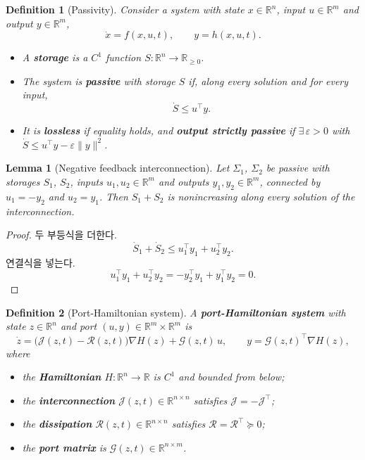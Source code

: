 \documentclass[11pt]{article}\usepackage[margin=1in]{geometry}\usepackage{amsmath,amssymb,amsthm,mathtools}\usepackage{graphicx}\graphicspath{{figures/}{../figures/}{figs/}{./}}\usepackage{enumitem}\usepackage{hyperref}\usepackage{cleveref}\usepackage{tikz}\usetikzlibrary{arrows.meta,positioning,calc,shapes.geometric}\usepackage{float}\usepackage{rotating}\usepackage[most]{tcolorbox}\usepackage{kotex}\usepackage{booktabs}\usepackage{longtable}\emergencystretch=1.6em\tolerance=2000 \crefname{assumption}{Assumption}{Assumptions}\Crefname{assumption}{Assumption}{Assumptions}\crefname{definition}{Definition}{Definitions}\Crefname{definition}{Definition}{Definitions}\crefname{proposition}{Proposition}{Propositions}\Crefname{proposition}{Proposition}{Propositions}\crefname{fact}{Fact}{Facts}\Crefname{fact}{Fact}{Facts} \newtheorem{assumption}{Assumption}\newtheorem{definition}{Definition}\newtheorem{lemma}{Lemma}\newtheorem{proposition}{Proposition}\newtheorem{theorem}{Theorem}\newtheorem{corollary}{Corollary}\newtheorem{fact}{Fact}\theoremstyle{remark}\newtheorem{remark}{Remark} \newcommand{\R}{\mathbb{R}}\newcommand{\xb}{\bar x}\newcommand{\Ab}{\bar A}\newcommand{\By}{\bar B_y}\newcommand{\U}{\mathcal U}\newcommand{\Z}{\mathcal Z}
\begin{document}
\begin{definition}[Passivity]
\label{def:passive}
Consider a system with state $x\in\R^{n}$, input $u\in\R^{m}$ and output $y\in\R^{m}$,
\[
\dot x=f(x,u,t),\qquad y=h(x,u,t).
\]
\begin{itemize}
\item A \textbf{\emph{storage}} is a $C^1$ function $S:\R^n\to\R_{\ge0}$.
\item The system is \textbf{\emph{passive}} with storage $S$ if, along every solution and for every input,
\[
\dot S\le u^\top y .
\]
\item It is \textbf{\emph{lossless}} if equality holds, and \textbf{\emph{output strictly passive}} if $\exists\,\varepsilon>0$ with $\dot S\le u^\top y-\varepsilon\|y\|^2$.
\end{itemize}
\end{definition}

\begin{lemma}[Negative feedback interconnection]
\label{lem:interconnect}
Let $\Sigma_1$, $\Sigma_2$ be passive with storages $S_1$, $S_2$, inputs $u_1,u_2\in\R^m$ and outputs $y_1,y_2\in\R^m$, connected by $u_1=-y_2$ and $u_2=y_1$. Then $S_1+S_2$ is nonincreasing along every solution of the interconnection.
\end{lemma}

\begin{proof}
두 부등식을 더한다.
\[
\dot S_1+\dot S_2\le u_1^\top y_1+u_2^\top y_2 .
\]
연결식을 넣는다.
\[
u_1^\top y_1+u_2^\top y_2=-y_2^\top y_1+y_1^\top y_2=0 .
\]
\end{proof}

\begin{definition}[Port-Hamiltonian system]
\label{def:ph}
A \textbf{\emph{port-Hamiltonian system}} with state $z\in\R^{n}$ and port $(u,y)\in\R^m\times\R^m$ is
\[
\dot z=\big(\mathcal J(z,t)-\mathcal R(z,t)\big)\nabla H(z)+\mathcal G(z,t)\,u,\qquad y=\mathcal G(z,t)^\top\nabla H(z),
\]
where
\begin{itemize}
\item the \textbf{\emph{Hamiltonian}} $H:\R^n\to\R$ is $C^1$ and bounded from below;
\item the \textbf{\emph{interconnection}} $\mathcal J(z,t)\in\R^{n\times n}$ satisfies $\mathcal J=-\mathcal J^\top$;
\item the \textbf{\emph{dissipation}} $\mathcal R(z,t)\in\R^{n\times n}$ satisfies $\mathcal R=\mathcal R^\top\succeq0$;
\item the \textbf{\emph{port matrix}} is $\mathcal G(z,t)\in\R^{n\times m}$.
\end{itemize}
\end{definition}
\end{document}
